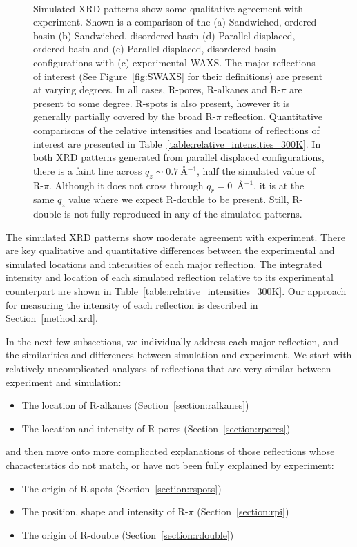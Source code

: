 \documentclass[journal=jpcbfk,manuscript=article]{achemso}
\begin{document}
\begin{figure}[!htb]
\begin{subfigure}{0.085\textwidth}
	\end{subfigure}	
	\caption{Simulated XRD patterns show some qualitative agreement with
		experiment. Shown is a comparison of the (a) Sandwiched, ordered basin (b)
		Sandwiched, disordered basin (d) Parallel displaced, ordered basin and (e)
		Parallel displaced, disordered basin configurations with (c) experimental WAXS.
		The major reflections of interest (See Figure~\ref{fig:SWAXS} for their
		definitions) are present at varying degrees. In all cases, R-pores, R-alkanes
		and R-$\pi$ are present to some degree. R-spots is also present, however it is
		generally partially covered by the broad R-$\pi$ reflection. Quantitative
		comparisons of the relative intensities and locations of reflections of
		interest are presented in Table~\ref{table:relative_intensities_300K}. In both
		XRD patterns generated from parallel displaced configurations, there is a faint line
		across $q_z \sim 0.7~$\AA$^{-1}$, half the simulated value of R-$\pi$. Although
		it does not cross through $q_r = 0$~\AA$^{-1}$, it is at the same $q_z$ value
		where we expect R-double to be present. Still, R-double is not fully reproduced
		in any of the simulated patterns.}~\label{fig:XRDsim} 
  \end{figure}
  
  The simulated XRD patterns show moderate agreement with experiment. There 
  are key qualitative and quantitative differences between the experimental and simulated
  locations and intensities of each major reflection. The integrated intensity and location
  of each simulated reflection relative to its experimental counterpart are shown in  
  Table~\ref{table:relative_intensities_300K}. Our approach for measuring the intensity of
  each reflection is described in Section~\ref{method:xrd}. 

  In the next few subsections, we individually address each major reflection, and the
  similarities and differences between simulation and experiment. We start with relatively 
  uncomplicated analyses of reflections that are very similar between experiment and simulation:
  \begin{itemize}
  	\item The location of R-alkanes (Section~\ref{section:ralkanes})
  	\item The location and intensity of R-pores (Section~\ref{section:rpores})
  \end{itemize}
  and then move onto more complicated explanations of those reflections whose characteristics
  do not match, or have not been fully explained by experiment:
  \begin{itemize}
  	\item The origin of R-spots (Section~\ref{section:rspots})
  	\item The position, shape and intensity of R-$\pi$ (Section~\ref{section:rpi})
  	\item The origin of R-double (Section~\ref{section:rdouble})
  \end{itemize}
  
\end{document}
